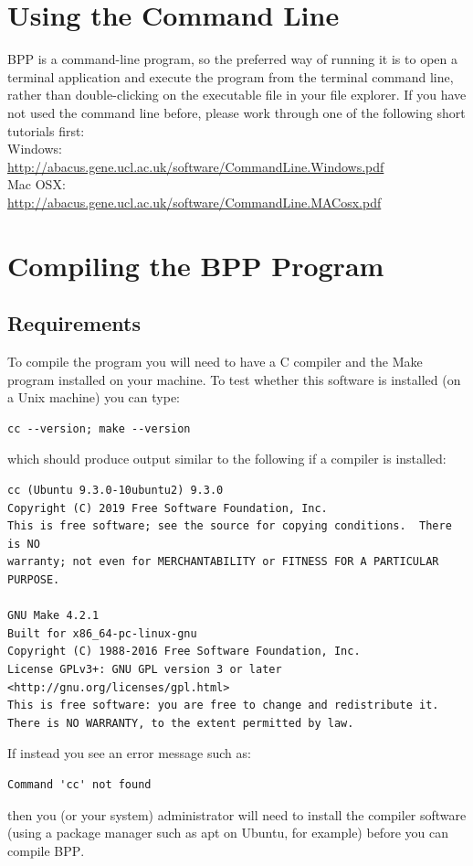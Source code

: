 \documentclass[a4paper]{book}
\numberwithin{equation}{section} \renewcommand{\baselinestretch}{0.55}
\begin{document}
\section{Using the Command Line}\label{commandline}
\textsc{BPP} is a command-line program, so the preferred way of
running it is to open a terminal application and execute the program
from the terminal command line, rather than double-clicking on the
executable file in your file explorer.  If you have not used the
command line before, please work through one of the following short
tutorials first:
\newline \noindent \vspace{0.1pt} \\
Windows: \vspace{0.1pt} \\
\href{http://abacus.gene.ucl.ac.uk/software/CommandLine.Windows.pdf}{http://abacus.gene.ucl.ac.uk/software/CommandLine.Windows.pdf}
\newline \noindent \vspace{0.1pt} \\
Mac OSX: \vspace{0.1pt} \\
\href{http://abacus.gene.ucl.ac.uk/software/CommandLine.MACosx.pdf}{http://abacus.gene.ucl.ac.uk/software/CommandLine.MACosx.pdf} \\

\section{Compiling the BPP Program}\label{compiling}
\subsection{Requirements}
To compile the program you will need to have a C compiler and the Make
program installed on your machine.  To test whether this software is
installed (on a Unix machine) you can type:
{\color{red}
\begin{verbatim}
cc --version; make --version
\end{verbatim}
}
\noindent
which should produce output similar to the following if a compiler
is installed:
{\small
\begin{verbatim}
cc (Ubuntu 9.3.0-10ubuntu2) 9.3.0
Copyright (C) 2019 Free Software Foundation, Inc.
This is free software; see the source for copying conditions.  There is NO
warranty; not even for MERCHANTABILITY or FITNESS FOR A PARTICULAR PURPOSE.

GNU Make 4.2.1
Built for x86_64-pc-linux-gnu
Copyright (C) 1988-2016 Free Software Foundation, Inc.
License GPLv3+: GNU GPL version 3 or later <http://gnu.org/licenses/gpl.html>
This is free software: you are free to change and redistribute it.
There is NO WARRANTY, to the extent permitted by law.
\end{verbatim}
  If instead you see an error message such as:
\begin{verbatim}
Command 'cc' not found
\end{verbatim}
}
\noindent
then you (or your system) administrator will need to install the
compiler software (using a package manager such as apt on Ubuntu,
for example) before you can compile \textsc{BPP}.
\end{document}
